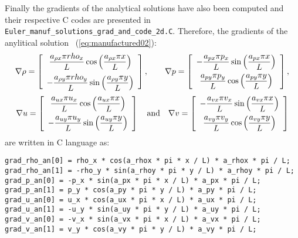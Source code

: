 \documentclass[10pt]{article}
\begin{document}
Finally the gradients of the analytical solutions have also been computed and their respective C codes are presented in \texttt{Euler\_manuf\_solutions\_grad\_and\_code\_2d.C}. Therefore, the gradients of the anylitical solution~ (\ref{eq:manufactured02}):
\begin{equation}
\nabla \rho = \left[ \begin{array}{c}
 \dfrac{  a_{\rho x}  \pi rho_x }{L} \cos\left( \dfrac{ a_{\rho x}  \pi  x }{L}\right) \vspace{5pt}\\ 
 -\dfrac{  a_{\rho y}  \pi rho_y }{L} \sin\left( \dfrac{ a_{\rho y}  \pi  y }{L}\right) 
\end{array} \right],
\qquad
\nabla p = \left[ \begin{array}{c}
- \dfrac{  a_{px}  \pi p_x }{L} \sin\left( \dfrac{ a_{px}  \pi  x }{L}\right) \vspace{5pt}\\
  \dfrac{  a_{py}  \pi p_y }{L} \cos\left( \dfrac{ a_{py}  \pi  y }{L}\right)
\end{array} \right],
\end{equation}
\begin{equation}
\nabla u = \left[ \begin{array}{c}
\dfrac{  a_{ux}  \pi u_x}{L} \cos\left( \dfrac{ a_{ux}  \pi  x }{L}\right)\vspace{5pt} \\
-  \dfrac{  a_{uy}  \pi u_y }{L} \sin\left( \dfrac{ a_{uy}  \pi  y }{L}\right)
\end{array} \right]
\quad \mbox{and} \quad
\nabla v = \left[ \begin{array}{c}
-  \dfrac{  a_{vx}  \pi v_x }{L} \sin\left( \dfrac{ a_{vx}  \pi  x }{L}\right)\vspace{5pt} \\
 \dfrac{  a_{vy}  \pi  v_y }{L} \cos\left( \dfrac{ a_{vy}  \pi  y }{L}\right) 
\end{array} \right]
\end{equation}
are written in C language as:

\begin{verbatim}
grad_rho_an[0] = rho_x * cos(a_rhox * pi * x / L) * a_rhox * pi / L;
grad_rho_an[1] = -rho_y * sin(a_rhoy * pi * y / L) * a_rhoy * pi / L;
grad_p_an[0] = -p_x * sin(a_px * pi * x / L) * a_px * pi / L;
grad_p_an[1] = p_y * cos(a_py * pi * y / L) * a_py * pi / L;
grad_u_an[0] = u_x * cos(a_ux * pi * x / L) * a_ux * pi / L;
grad_u_an[1] = -u_y * sin(a_uy * pi * y / L) * a_uy * pi / L;
grad_v_an[0] = -v_x * sin(a_vx * pi * x / L) * a_vx * pi / L;
grad_v_an[1] = v_y * cos(a_vy * pi * y / L) * a_vy * pi / L;
\end{verbatim}

 

\end{document}

